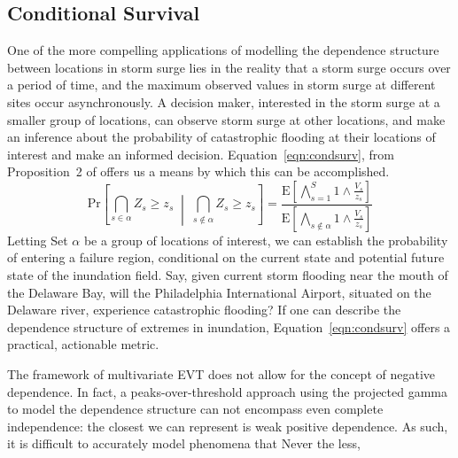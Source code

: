 \subsection{Conditional Survival}
One of the more compelling applications of modelling the dependence structure between locations in 
    storm surge lies in the reality that a storm surge occurs over a period of time, and the 
    maximum observed values in storm surge at different sites occur asynchronously.  A decision maker,
    interested in the storm surge at a smaller group of locations, can observe storm surge at other
    locations, and make an inference about the probability of catastrophic flooding at their locations
    of interest and make an informed decision.
    Equation~\eqref{eqn:condsurv}, from Proposition~2 of \cite{trubey:pg} offers us a means by which 
    this can be accomplished.
    \begin{equation}
        \label{eqn:condsurv}
        \text{Pr}\left[\bigcap_{s\in\alpha}Z_s \geq z_s\;\middle|\;\bigcap_{s\not\in\alpha}Z_s \geq z_s\right] =
        \frac{
            \text{E}\left[\bigwedge_{s=1}^S 1\wedge \frac{V_s}{z_s}\right]
        }{
            \text{E}\left[\bigwedge_{s\not\in\alpha} 1\wedge \frac{V_s}{z_s}\right]
        }
    \end{equation}
    Letting Set $\alpha$ be a group of locations of interest, we can establish the probability of
    entering a failure region, conditional on the current state and potential future state of the inundation 
    field.  Say, given current storm flooding near the mouth of the Delaware Bay, will the Philadelphia 
    International Airport, situated on the Delaware river, experience catastrophic flooding?  If one can 
    describe the dependence structure of extremes in inundation, Equation~\ref{eqn:condsurv} offers a 
    practical, actionable metric.


    The framework of multivariate EVT does not allow for the concept of negative dependence.  In fact, 
    a peaks-over-threshold approach using the projected gamma to model the dependence structure can not 
    encompass even complete independence: the closest we can represent is weak positive dependence.
    As such, it is difficult to accurately model phenomena that 
    Never the less, 

    






